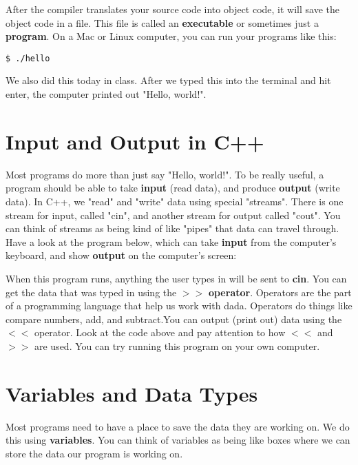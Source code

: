 \documentclass[a4paper,12pt]{article} %
\begin{document}
\noindent
After the compiler translates your source code into object code, it will save the object code in a file. This file is called an \textbf{executable} or sometimes just a \textbf{program}. On a Mac or Linux computer, you can run your programs like this:

\vspace{5mm}
\begin{lstlisting}
$ ./hello
\end{lstlisting}

\noindent
We also did this today in class. After we typed this into the terminal and hit enter, the computer printed out "Hello, world!". 

\clearpage

\section{Input and Output in C++}

Most programs do more than just say "Hello, world!". To be really useful, a program should be able to take \textbf{input} (read data), and produce \textbf{output} (write data). In C++, we "read" and "write" data using special "streams". There is one stream for input, called "cin", and another stream for output called "cout". You can think of streams as being kind of like "pipes" that data can travel through. Have a look at the program below, which can take \textbf{input} from the computer's keyboard, and show \textbf{output} on the computer's screen:

\vspace{5mm}


\noindent
When this program runs, anything the user types in will be sent to \textbf{cin}. You can get the data that was typed in using the $>>$ \textbf{operator}. Operators are the part of a programming language that help us work with dada. Operators do things like compare numbers, add, and subtract.You can output (print out) data using the $<<$ operator. Look at the code above and pay attention to how $<<$ and $>>$ are used. You can try running this program on your own computer.

\section{Variables and Data Types}

Most programs need to have a place to save the data they are working on. We do this using \textbf{variables}. You can think of variables as being like boxes where we can store the data our program is working on.\\
\end{document}
